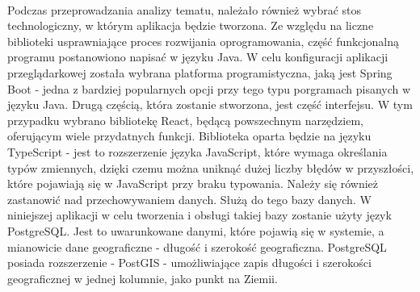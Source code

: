 \paragraph{}
Podczas przeprowadzania analizy tematu, należało również wybrać stos technologiczny, w którym aplikacja będzie tworzona. Ze względu na liczne biblioteki usprawniające proces rozwijania oprogramowania, część funkcjonalną programu postanowiono napisać w języku Java. W celu konfiguracji aplikacji przeglądarkowej została wybrana platforma programistyczna, jaką jest Spring Boot - jedna z bardziej popularnych opcji przy tego typu porgramach pisanych w języku Java. Drugą częścią, która zostanie stworzona, jest część interfejsu. W tym przypadku wybrano bibliotekę React, będącą powszechnym narzędziem, oferującym wiele przydatnych funkcji. Biblioteka oparta będzie na języku TypeScript - jest to rozszerzenie języka JavaScript, które wymaga określania typów zmiennych, dzięki czemu można uniknąć dużej liczby błędów w przyszłości, które pojawiają się w JavaScript przy braku typowania. Należy się również zastanowić nad przechowywaniem danych. Służą do tego bazy danych. W niniejszej aplikacji w celu tworzenia i obsługi takiej bazy zostanie użyty język PostgreSQL. Jest to uwarunkowane danymi, które pojawią się w systemie, a mianowicie dane geograficzne - długość i szerokość geograficzna. PostgreSQL posiada rozszerzenie - PostGIS - umożliwiające zapis długości i szerokości geograficznej w jednej kolumnie, jako punkt na Ziemii.








